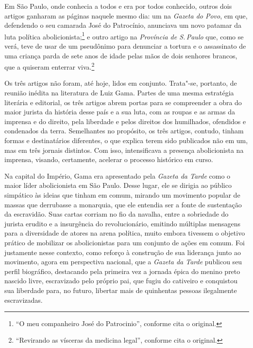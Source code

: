 \begin{multicols}{2}
Em São Paulo, onde conhecia a todos e era por todos conhecido, outros dois artigos ganharam as páginas naquele mesmo dia: um na \textit{Gazeta do Povo}, em que, defendendo o seu camarada José do Patrocínio, anunciava um novo patamar da luta política abolicionista;\footnote{``O meu companheiro José do Patrocinio'', conforme cita o original.} e outro artigo na \textit{Província de S.\,Paulo} que, como se verá, teve de usar de um pseudônimo para denunciar a tortura e o assassinato de uma criança parda de sete anos de idade pelas mãos de dois senhores brancos, que a quiseram enterrar viva.\footnote{``Revirando as vísceras da medicina legal'', conforme cita o original.}

Os três artigos não foram, até hoje, lidos em conjunto. Trata"-se, portanto, de reunião inédita na literatura de Luiz Gama. Partes de uma mesma estratégia literária e editorial, os três artigos abrem portas para se compreender a obra do maior jurista da história desse país e a sua luta, com as roupas e as armas da imprensa e do direito, pela liberdade e pelos direitos dos humilhados, ofendidos e condenados da terra. Semelhantes no propósito, os três artigos, contudo, tinham formas e destinatários diferentes, o que explica terem sido publicados não em um, mas em três jornais distintos. Com isso, intensificava a presença abolicionista na imprensa, visando, certamente, acelerar o processo histórico em curso.

Na capital do Império, Gama era apresentado pela \textit{Gazeta da Tarde} como o maior líder abolicionista em São Paulo. Desse lugar, ele se dirigia ao público simpático às ideias que tinham em comum, mirando um movimento popular de massas que derrubasse a monarquia, que ele entendia ser a fonte de sustentação da escravidão. Suas cartas corriam no fio da navalha, entre a sobriedade do jurista erudito e a insurgência do revolucionário, emitindo múltiplas mensagens para a diversidade de atores na arena política, muito embora tivessem o objetivo prático de mobilizar os abolicionistas para um conjunto de ações em comum. Foi justamente nesse contexto, como reforço à construção de sua liderança junto ao movimento, agora em perspectiva nacional, que a \textit{Gazeta da Tarde} publicou seu perfil biográfico, destacando pela primeira vez a jornada épica do menino preto nascido livre, escravizado pelo próprio pai, que fugiu do cativeiro e conquistou sua liberdade para, no futuro, libertar mais de quinhentas pessoas ilegalmente escravizadas.

\bigskip
\noindent{}\textcolor{gray}{\footnotesize{}}
\end{multicols}

